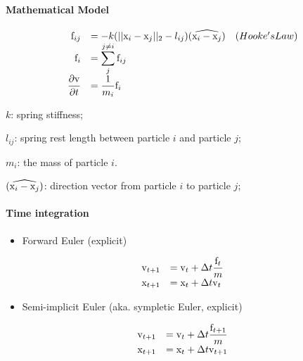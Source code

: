 \documentclass[11pt]{article}
\providecommand{\tightlist}{%
      \setlength{\itemsep}{0pt}\setlength{\parskip}{0pt}}
\begin{document}
\hypertarget{mathematical-model}{%
\paragraph{Mathematical Model}\label{mathematical-model}}

\begin{equation*}
\begin{array}{rll}
    {\rm f}_ {ij} &=-k(||{\rm x}_ {i}-{\rm x}_ {j}||_ {2}- l_{ij})(\widehat{{\rm x}_ {i}-{\rm x}_ {j}})&(Hooke's Law) \\
    {\rm f}_ {i} &= \displaystyle\sum_{j}^{j\ne i}{\rm f}_ {ij}  & \\
    \displaystyle\frac{\partial {\rm v}}{\partial t} &= \displaystyle\frac{1}{m_{i}}{\rm f}_ {i} &
\end{array}
\end{equation*}

\(k\): spring stiffness;

\(l_{ij}\): spring rest length between particle \(i\) and particle
\(j\);

\(m_{i}\): the mass of particle \(i\).

\((\widehat{{\rm x}_ {i}-{\rm x}_ {j}})\): direction vector from
particle \(i\) to particle \(j\);

\hypertarget{time-integration}{%
\paragraph{Time integration}\label{time-integration}}

\begin{itemize}
\tightlist
\item
  Forward Euler (explicit)
\end{itemize}

\begin{equation*}
\begin{array}{rl}
    {\rm v}_ {t+1} &={\rm v}_ {t}+\Delta t\displaystyle\frac{{\rm f}_ {t}}{m} \\
    {\rm x}_ {t+1} &={\rm x}_ {t}+\Delta t{\rm v}_{t}
\end{array}
\end{equation*}

\begin{itemize}
\tightlist
\item
  Semi-implicit Euler (aka. sympletic Euler, explicit)
\end{itemize}

\begin{equation*}
\begin{array}{rl}
    {\rm v}_ {t+1} &= {\rm v}_ {t}+\Delta t\displaystyle\frac{{\rm f}_ {t+1}}{m} \\
    {\rm x}_ {t+1} &= {\rm x}_ {t}+\Delta t{\rm v}_{t+1}
\end{array}
\end{equation*}
\end{document}
